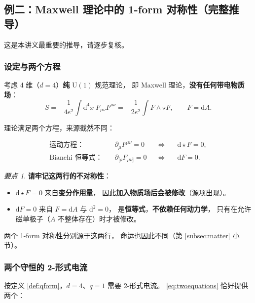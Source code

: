 \documentclass[UTF8,a4paper,11pt]{ctexart}
\theoremstyle{plain}
\theoremstyle{definition}
\theoremstyle{remark}
\newtheorem{keypoint}{要点}[section]
\newcommand{\ext}{\mathrm{d}}          %
\newcommand{\hs}{\star}                %
\newcommand{\Uone}{\mathrm{U}(1)}
\begin{document}
\subsection{例二：Maxwell 理论中的 1-form 对称性（完整推导）}
\label{subsec:maxwell}

这是本讲义最重要的推导，请逐步复核。

\subsubsection{设定与两个方程}

考虑 4 维（$d=4$）\textbf{纯} $\Uone$ 规范理论，
即 Maxwell 理论，\textbf{没有任何带电物质场}：
\begin{equation}
  S=-\frac{1}{4e^2}\int \ext^4x\;F_{\mu\nu}F^{\mu\nu}
   =-\frac{1}{2e^2}\int F\wedge\hs F ,
  \qquad F=\ext A .
  \label{eq:maxwellaction}
\end{equation}

理论满足两个方程，来源截然不同：

\begin{equation}
  \boxed{
  \begin{aligned}
    \text{运动方程：}&\quad \partial_\mu F^{\mu\nu}=0
      &&\Longleftrightarrow&&\ \ext\hs F=0 ,\\
    \text{Bianchi 恒等式：}&\quad \partial_{[\rho}F_{\mu\nu]}=0
      &&\Longleftrightarrow&&\ \ext F=0 .
  \end{aligned}}
  \label{eq:twoequations}
\end{equation}

\begin{keypoint}
\label{kp:two-sources}
\textbf{请牢记这两行的不对称性}：
\begin{itemize}
  \item $\ext\hs F=0$ 来自\textbf{变分作用量}，
        因此\textbf{加入物质场后会被修改}（源项出现）。
  \item $\ext F=0$ 来自 $F=\ext A$ 与 $\ext^2=0$，
        是\textbf{恒等式}，\textbf{不依赖任何动力学}，
        只有在允许磁单极子（$A$ 不整体存在）时才被修改。
\end{itemize}
两个 1-form 对称性分别源于这两行，
命运也因此不同（第 \ref{subsec:matter} 小节）。
\end{keypoint}

\subsubsection{两个守恒的 2-形式电流}

按定义 \ref{def:qform}，$d=4$、$q=1$ 需要 2-形式电流。
\eqref{eq:twoequations} 恰好提供两个：
\end{document}
